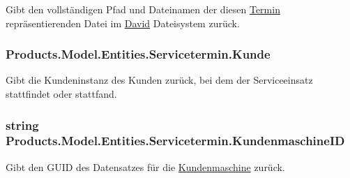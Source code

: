 Gibt den vollständigen Pfad und Dateinamen der diesen \hyperlink{class_products_1_1_model_1_1_entities_1_1_termin}{Termin} repräsentierenden Datei im \hyperlink{namespace_david}{David} Dateisystem zurück. 

\subsubsection[{\texorpdfstring{Kunde}{Kunde}}]{ Products.\+Model.\+Entities.\+Servicetermin.\+Kunde\hspace{0.3cm}{\ttfamily [get]}}\hypertarget{class_products_1_1_model_1_1_entities_1_1_servicetermin_ae762398a401a1a2a3428b270176c96dd}{}\label{class_products_1_1_model_1_1_entities_1_1_servicetermin_ae762398a401a1a2a3428b270176c96dd}


Gibt die Kundeninstanz des Kunden zurück, bei dem der Serviceeinsatz stattfindet oder stattfand. 

\subsubsection[{\texorpdfstring{Kundenmaschine\+ID}{KundenmaschineID}}]{\setlength{\rightskip}{0pt plus 5cm}string Products.\+Model.\+Entities.\+Servicetermin.\+Kundenmaschine\+ID\hspace{0.3cm}{\ttfamily [get]}}\hypertarget{class_products_1_1_model_1_1_entities_1_1_servicetermin_a42eb7f3ca9cafbd9d6f6ecd7db2e96d2}{}\label{class_products_1_1_model_1_1_entities_1_1_servicetermin_a42eb7f3ca9cafbd9d6f6ecd7db2e96d2}


Gibt den G\+U\+ID des Datensatzes für die \hyperlink{class_products_1_1_model_1_1_entities_1_1_kundenmaschine}{Kundenmaschine} zurück. 


